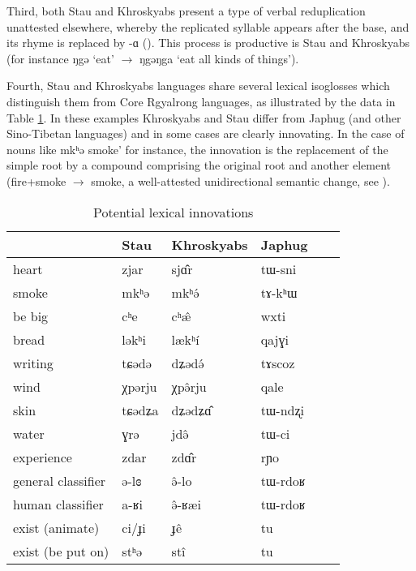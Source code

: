 \documentclass[oneside,a4paper,11pt]{article}
\newcommand{\ipa}[1]{{\phon#1}} %
\begin{document}
Third, both Stau and Khroskyabs present a type of verbal reduplication unattested elsewhere, whereby the replicated syllable appears after the base, and its rhyme is replaced by \ipa{-ɑ} (\citealt{lai13fuyin}). This process is productive is Stau and Khroskyabs (for instance \ipa{ŋgə} `eat' $\rightarrow$ \ipa{ŋgəŋga} `eat all kinds of things').
 
 
 Fourth, Stau and Khroskyabs languages share several lexical isoglosses which distinguish them from Core Rgyalrong languages, as illustrated by the data in Table \ref{tab:lexicon}. In  these examples Khroskyabs and Stau differ from Japhug (and other Sino-Tibetan languages) and in some cases are clearly innovating. In the case of nouns like \ipa{mkʰə}  smoke' for instance, the innovation is the replacement of the simple root by a compound comprising the original root and another element (fire+smoke $\rightarrow$ smoke, a well-attested unidirectional semantic change, see \citealt{urban11semantic}). 
 
  \begin{table}[h]
  \caption{Potential lexical innovations} \label{tab:lexicon} \centering
 \begin{tabular}{llllll}
 \toprule
 &	Stau &	Khroskyabs &	Japhug &	\\	
  \midrule
heart &	\ipa{zjar}  &	\ipa{sjɑ̂r} &	\ipa{tɯ-sni} &	\\	
smoke  &	\ipa{mkʰə} &	\ipa{mkʰə́} &	\ipa{tɤ-kʰɯ} &	\\	
be big  &	\ipa{cʰe} &	\ipa{cʰæ̂} &	\ipa{wxti} &	\\	
bread  &	\ipa{ləkʰi} &	\ipa{lækʰí} &	\ipa{qajɣi} &	\\	
writing  &	\ipa{tɕədə} &	\ipa{dʑədə́} &	\ipa{tɤscoz} &	\\	
wind  &	\ipa{χpərju} &	\ipa{χpə̂rju    } &	\ipa{qale} &	\\	
skin  &	\ipa{tɕədʑa} &	\ipa{dʑədʑɑ̂} &	\ipa{tɯ-ndʐi} &	\\	
water  &	\ipa{ɣrə} &	\ipa{jdə̂} &	\ipa{tɯ-ci} &	\\
experience  &	\ipa{zdar} &	\ipa{zdɑ̂r} &	\ipa{rɲo} &	\\	
  \midrule
general classifier  &	\ipa{ə-lɞ} &	\ipa{ə̂-lo} &	\ipa{tɯ-rdoʁ} &	\\	
human classifier  &	\ipa{a-ʁi} &	\ipa{ə̂-ʁæi} &	\ipa{tɯ-rdoʁ} &	\\	
  \midrule
exist (animate)  &	\ipa{ci/ɟi} &	\ipa{ɟê} &	\ipa{tu} &	\\	
exist (be put on)  &	\ipa{stʰə} &	\ipa{stî} &	\ipa{tu} &	\\	
\bottomrule
\end{tabular}
\end{table}
\end{document}
